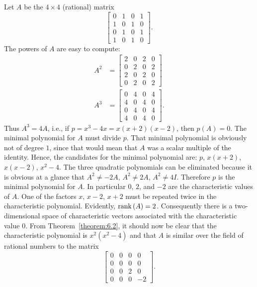 \begin{example}
    Let \(A\) be the \(4\times4\) (rational) matrix
    \begin{equation*}
        \begin{bmatrix}
            0 & 1 & 0 & 1 \\
            1 & 0 & 1 & 0 \\
            0 & 1 & 0 & 1 \\
            1 & 0 & 1 & 0
        \end{bmatrix}
        .
    \end{equation*}
    The powers of \(A\) are easy to compute:
    \begin{align*}
        A^2&=
        \begin{bmatrix}
            2 & 0 & 2 & 0 \\
            0 & 2 & 0 & 2 \\
            2 & 0 & 2 & 0 \\
            0 & 2 & 0 & 2
        \end{bmatrix}
        \\
        A^3&=
        \begin{bmatrix}
            0 & 4 & 0 & 4 \\
            4 & 0 & 4 & 0 \\
            0 & 4 & 0 & 4 \\
            4 & 0 & 4 & 0
        \end{bmatrix}
        .
    \end{align*}
    Thus \(A^3=4A\), i.e., if \(p=x^3-4x=x\left(x+2\right)\left(x-2\right)\), then \(p\left(A\right)=0\). The minimal polynomial for \(A\) must divide \(p\). That minimal polynomial is obviously not of degree \(1\), since that would mean that \(A\) was a scalar multiple of the identity. Hence, the candidates for the minimal polynomial are: \(p\), \(x\left(x+2\right)\), \(x\left(x-2\right)\), \(x^2-4\). The three quadratic polynomials can be eliminated because it is obvious at a glance that \(A^2\ne-2A\), \(A^2\ne2A\), \(A^2\ne4I\). Therefore \(p\) is the minimal polynomial for \(A\). In particular \(0\), \(2\), and \(-2\) are the characteristic values of \(A\). One of the factors \(x\), \(x-2\), \(x+2\) must be repeated twice in the characteristic polynomial. Evidently, \(\operatorname{rank}\left(A\right)=2\). Consequently there is a two-dimensional space of characteristic vectors associated with the characteristic value \(0\). From Theorem~\ref{theorem:6.2}, it should now be clear that the characteristic polynomial is \(x^2\left(x^2-4\right)\) and that \(A\) is similar over the field of rational numbers to the matrix
    \begin{equation}
        \begin{bmatrix}
            0 & 0 & 0 & 0 \\
            0 & 0 & 0 & 0 \\
            0 & 0 & 2 & 0 \\
            0 & 0 & 0 & -2
        \end{bmatrix}
        .
    \end{equation}
\end{example}

